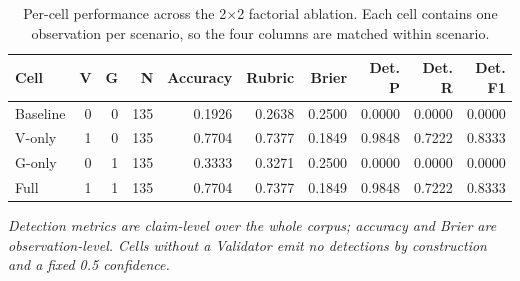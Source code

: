 \begin{table}[htbp]
\centering
\small
\caption{Per-cell performance across the 2$\times$2 factorial ablation. Each cell contains one observation per scenario, so the four columns are matched within scenario.}
\label{tab:gmais-2}
\begin{tabular}{lrrrrrrrrr}
\toprule
Cell & V & G & N & Accuracy & Rubric & Brier & Det. P & Det. R & Det. F1 \\
\midrule
Baseline & 0 & 0 & 135 & 0.1926 & 0.2638 & 0.2500 & 0.0000 & 0.0000 & 0.0000 \\
V-only & 1 & 0 & 135 & 0.7704 & 0.7377 & 0.1849 & 0.9848 & 0.7222 & 0.8333 \\
G-only & 0 & 1 & 135 & 0.3333 & 0.3271 & 0.2500 & 0.0000 & 0.0000 & 0.0000 \\
Full & 1 & 1 & 135 & 0.7704 & 0.7377 & 0.1849 & 0.9848 & 0.7222 & 0.8333 \\
\bottomrule
\end{tabular}
\par\vspace{2pt}\footnotesize\emph{Detection metrics are claim-level over the whole corpus; accuracy and Brier are observation-level. Cells without a Validator emit no detections by construction and a fixed 0.5 confidence.}
\end{table}
